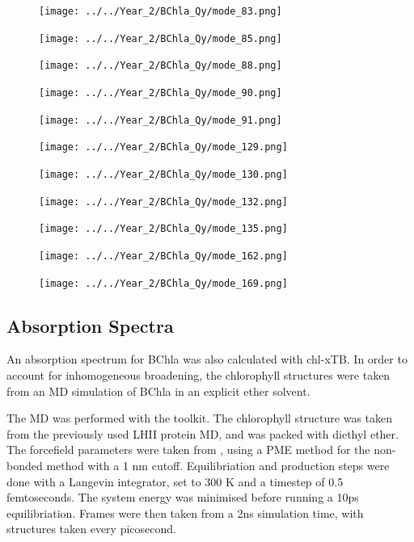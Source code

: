 \begin{figure}
    \texttt{[image: ../../Year\_2/BChla\_Qy/mode\_83.png]}
\end{figure}
\begin{figure}
    \texttt{[image: ../../Year\_2/BChla\_Qy/mode\_85.png]}
\end{figure}
\begin{figure}
    \texttt{[image: ../../Year\_2/BChla\_Qy/mode\_88.png]}
\end{figure}
\begin{figure}
    \texttt{[image: ../../Year\_2/BChla\_Qy/mode\_90.png]}
\end{figure}
\begin{figure}
    \texttt{[image: ../../Year\_2/BChla\_Qy/mode\_91.png]}
\end{figure}
\begin{figure}
    \texttt{[image: ../../Year\_2/BChla\_Qy/mode\_129.png]}
\end{figure}
\begin{figure}
    \texttt{[image: ../../Year\_2/BChla\_Qy/mode\_130.png]}
\end{figure}
\begin{figure}
    \texttt{[image: ../../Year\_2/BChla\_Qy/mode\_132.png]}
\end{figure}
\begin{figure}
    \texttt{[image: ../../Year\_2/BChla\_Qy/mode\_135.png]}
\end{figure}
\begin{figure}
    \texttt{[image: ../../Year\_2/BChla\_Qy/mode\_162.png]}
\end{figure}
\begin{figure}
    \texttt{[image: ../../Year\_2/BChla\_Qy/mode\_169.png]}
\end{figure}

\subsection{Absorption Spectra}
\label{subsec:absorption_spectra}

An absorption spectrum for BChla was also calculated with chl-xTB.
In order to account for inhomogeneous broadening, the chlorophyll structures were
taken from an MD simulation of BChla in an explicit ether solvent.

The MD was performed with the  toolkit. The chlorophyll structure was
taken from the previously used LHII protein MD, and was packed with diethyl ether.
The forcefield parameters were taken from , using a PME method for the non-bonded
method with a 1 nm cutoff. Equilibriation and production steps were done with a
Langevin integrator, set to 300 K and a timestep of 0.5 femtoseconds. The system
energy was minimised before running a 10ps equilibriation. Frames were then taken
from a 2ns simulation time, with structures taken every picosecond. 

